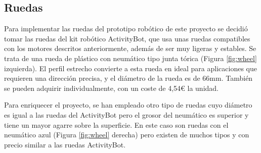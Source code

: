 \setcounter{footnote}{41} %


\subsection{Ruedas}

Para implementar las ruedas del prototipo robótico de este proyecto se decidió tomar las ruedas del kit robótico ActivityBot, que usa unas ruedas compatibles con los motores descritos anteriormente, además de ser muy ligeras y estables. Se trata de una rueda de plástico con neumático tipo junta tórica (Figura \ref{fig:wheel} izquierda). El perfil estrecho convierte a esta rueda en ideal para aplicaciones que requieren una dirección precisa, y el diámetro de la rueda es de 66mm. También se pueden adquirir individualmente, con un coste de 4,54€ la unidad.

Para enriquecer el proyecto, se han empleado otro tipo de ruedas cuyo diámetro es igual a las ruedas del ActivityBot pero el grosor del neumático es superior y tiene un mayor agarre sobre la superficie. En este caso son ruedas con el neumático azul (Figura \ref{fig:wheel} derecha) pero existen de muchos tipos y con precio similar a las ruedas ActivityBot.

